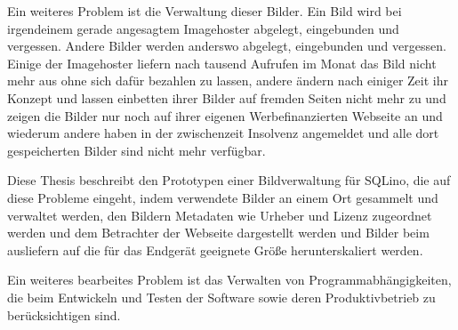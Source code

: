 
Ein weiteres Problem ist die Verwaltung dieser Bilder. Ein Bild wird bei
irgendeinem gerade angesagtem Imagehoster abgelegt, eingebunden und vergessen.
Andere Bilder werden anderswo abgelegt, eingebunden und vergessen. Einige der
Imagehoster liefern nach tausend Aufrufen im Monat das Bild nicht mehr aus ohne
sich dafür bezahlen zu lassen, andere ändern nach einiger Zeit ihr Konzept und
lassen einbetten ihrer Bilder auf fremden Seiten nicht mehr zu und zeigen die
Bilder nur noch auf ihrer eigenen Werbefinanzierten Webseite an und wiederum
andere haben in der zwischenzeit Insolvenz angemeldet und alle dort
gespeicherten Bilder sind nicht mehr verfügbar.

Diese Thesis beschreibt den Prototypen einer Bildverwaltung für SQLino, die auf
diese Probleme eingeht, indem verwendete Bilder an einem Ort gesammelt und
verwaltet werden, den Bildern Metadaten wie Urheber und Lizenz zugeordnet
werden und dem Betrachter der Webseite dargestellt werden und Bilder beim
ausliefern auf die für das Endgerät geeignete Größe herunterskaliert werden.

Ein weiteres bearbeites Problem ist das Verwalten von Programmabhängigkeiten,
die beim Entwickeln und Testen der Software sowie deren Produktivbetrieb zu
berücksichtigen sind. 

